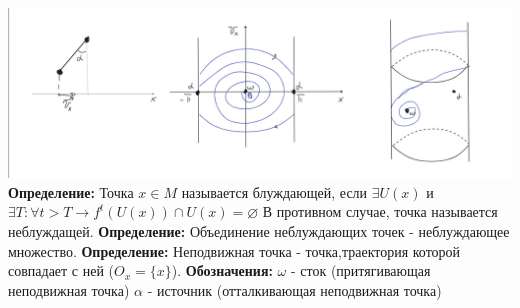\documentclass[12pt,a4paper]{article}
\begin{document}
\includegraphics[scale=0.3]{allimage.png}
\newline
\textbf{Определение:} Точка \(x\in M\) называется блуждающей, если \(\exists U(x)\) и \(\exists T : \forall t >T \rightarrow f^t(U(x))\cap U(x) = \varnothing\) 
\newline В противном случае, точка называется неблуждащей.
\newline \textbf{Определение:} Объединение неблуждающих точек - неблуждающее множество.
\newline \textbf{Определение: } Неподвижная точка - точка,траектория которой совпадает с ней (\(O_x = \{x\}\)).
\newline \textbf{Обозначения: } \(\omega\) - сток (притягивающая неподвижная точка)
\newline \(\alpha\) - источник (отталкивающая неподвижная точка)
\end{document}
